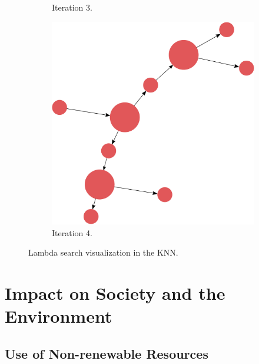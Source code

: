 \documentclass[titlepage,11pt]{article}
\begin{document}
\begin{figure}[!htb]
\begin{subfigure}[!htb]{0.19\textwidth}
		\caption{Iteration 3.}
	\end{subfigure}
	\begin{subfigure}[!htb]{0.19\textwidth}
		\centering
		\includegraphics[width=\columnwidth]{figures/knn_simple_lambda_think_4.pdf}
		\caption{Iteration 4.}
	\end{subfigure}
	\caption{Lambda search visualization in the KNN.}
	\label{fig:lambda_search_test}
\end{figure} 

\section{Impact on Society and the Environment}
\label{sec:impact}


\subsection{Use of Non-renewable Resources}
\end{document}
